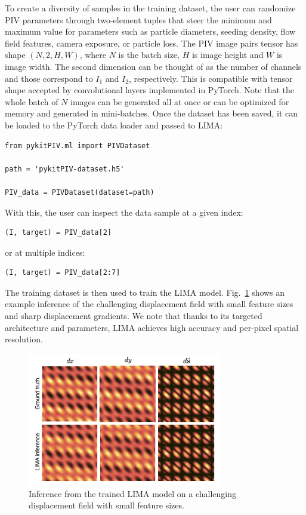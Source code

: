 \documentclass[a4paper,fleqn]{cas-dc}
\newcommand{ \kamila}[1]{\color{blue}{Kamila: #1} \color{black}}
\begin{document}
To create a diversity of samples in the training dataset, the user can randomize PIV parameters through two-element tuples that steer the minimum and maximum value for parameters such as particle diameters, seeding density, flow field features, camera exposure, or particle loss. The PIV image pairs tensor has shape $(N, 2, H, W)$, where $N$ is the batch size, $H$ is image height and $W$ is image width. The second dimension can be thought of as the number of channels and those correspond to $I_1$ and $I_2$, respectively. This is compatible with tensor shape accepted by convolutional layers implemented in PyTorch. Note that the whole batch of $N$ images can be generated all at once or can be optimized for memory and generated in mini-batches. Once the dataset has been saved, it can be loaded to the PyTorch data loader and passed to LIMA:
\lstset{language=Python}
\begin{lstlisting}
from pykitPIV.ml import PIVDataset

path = 'pykitPIV-dataset.h5'

PIV_data = PIVDataset(dataset=path)
\end{lstlisting}
With this, the user can inspect the data sample at a given index:
\lstset{language=Python}
\begin{lstlisting}
(I, target) = PIV_data[2]
\end{lstlisting}
or at multiple indices:
\lstset{language=Python}
\begin{lstlisting}
(I, target) = PIV_data[2:7]
\end{lstlisting}
The training dataset is then used to train the LIMA model. Fig.~\ref{fig:LIMA} shows an example inference of the challenging displacement field with small feature sizes and sharp displacement gradients. We note that thanks to its targeted architecture and parameters, LIMA achieves high accuracy and per-pixel spatial resolution.

\begin{figure}[t]
\centering
\includegraphics[width=8.5cm]{LIMA-inference.pdf}
\caption{Inference from the trained LIMA model on a challenging displacement field with small feature sizes. \kamila{This is my old training case, I will update it with the latest LIMA version after running new training on CSCS...}}
\label{fig:LIMA}
\end{figure}
\end{document}
